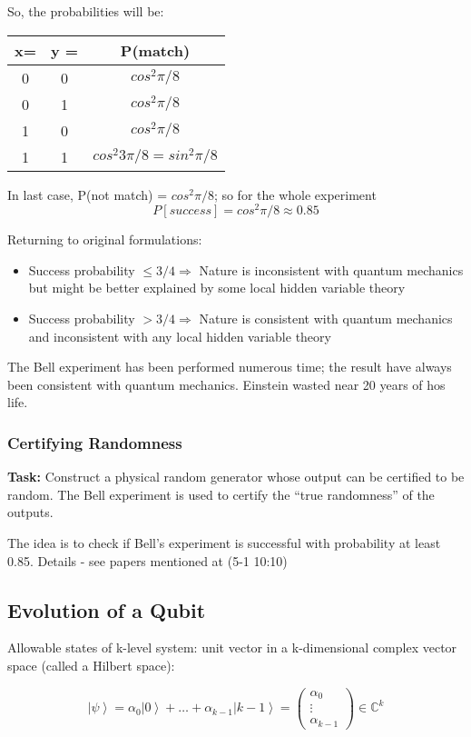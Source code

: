 \documentclass{scrartcl}
\newcommand{\cplx}{\mathbb{C}} %
\newcommand{\ket}[1]{\left| #1 \right>} %
\begin{document}
So, the probabilities will be:
\begin{tabular}{cc|c}
  \textbf{ x=} & \textbf{ y = } & \textbf{P(match)} \\
  \hline
  0 & 0  & $cos^2 \pi/8$ \\
  0 & 1  & $cos^2 \pi/8$ \\
  1 & 0  & $cos^2 \pi/8$ \\
  1 & 1  & $cos^2 3\pi/8 = sin^2 \pi/8$ \\
\end{tabular}

In last case, P(not match) = $cos^2 \pi / 8$; so for the whole experiment
$$P[success] = cos^2 \pi / 8 \approx 0.85$$

Returning to original formulations:
\begin{itemize}
\item Success probability $\leq 3/4 \Rightarrow$ Nature is inconsistent with
  quantum mechanics but might be better explained by some local hidden variable
  theory
\item Success probability $> 3/4 \Rightarrow$ Nature is consistent with quantum
  mechanics and inconsistent with any local hidden variable theory
\end{itemize}
The Bell experiment has been performed numerous time; the result have always
been consistent with quantum mechanics. Einstein wasted near 20 years of hos
life.

\subsubsection{Certifying Randomness}
\label{sec:5-1}

{\bf Task:} Construct a physical random generator whose output can be certified
to be random. The Bell experiment is used to certify the ``true randomness'' of
the outputs.

The idea is to check if Bell's experiment is successful with probability at
least 0.85. Details - see papers mentioned at (5-1 10:10)

\subsection{Evolution of a Qubit}
\label{sec:5-2}

Allowable states of k-level system: unit vector in a k-dimensional complex
vector space (called a Hilbert space):

\[\ket\psi = \alpha_0\ket0 + \dots + \alpha_{k-1}\ket{k-1} =
\begin{pmatrix} \alpha_0 \\ \vdots \\ \alpha_{k-1} \end{pmatrix} \in
\cplx^k\]
\end{document}

